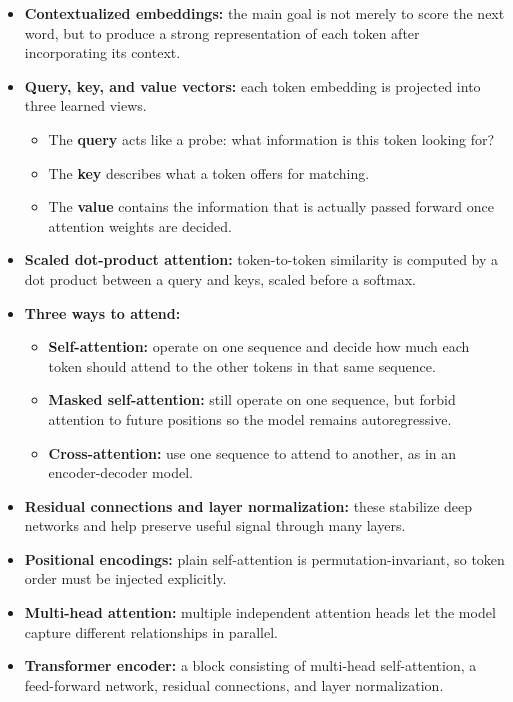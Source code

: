 \documentclass[11pt]{article}
\begin{document}
\begin{itemize}
    \item \textbf{Contextualized embeddings:} the main goal is not merely to score the next word, but to produce a strong representation of each token after incorporating its context.
    \item \textbf{Query, key, and value vectors:} each token embedding is projected into three learned views.
    \begin{itemize}
        \item The \textbf{query} acts like a probe: what information is this token looking for?
        \item The \textbf{key} describes what a token offers for matching.
        \item The \textbf{value} contains the information that is actually passed forward once attention weights are decided.
    \end{itemize}
    \item \textbf{Scaled dot-product attention:} token-to-token similarity is computed by a dot product between a query and keys, scaled before a softmax.
    \item \textbf{Three ways to attend:}
    \begin{itemize}
        \item \textbf{Self-attention:} operate on one sequence and decide how much each token should attend to the other tokens in that same sequence.
        \item \textbf{Masked self-attention:} still operate on one sequence, but forbid attention to future positions so the model remains autoregressive.
        \item \textbf{Cross-attention:} use one sequence to attend to another, as in an encoder-decoder model.
    \end{itemize}
    \item \textbf{Residual connections and layer normalization:} these stabilize deep networks and help preserve useful signal through many layers.
    \item \textbf{Positional encodings:} plain self-attention is permutation-invariant, so token order must be injected explicitly.
    \item \textbf{Multi-head attention:} multiple independent attention heads let the model capture different relationships in parallel.
    \item \textbf{Transformer encoder:} a block consisting of multi-head self-attention, a feed-forward network, residual connections, and layer normalization.

\end{itemize}
\end{document}
